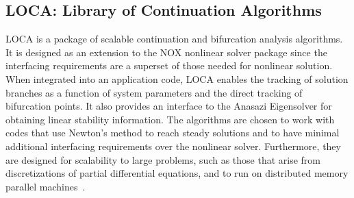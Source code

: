 \documentclass[12pt,relax]{TPA}
\begin{document}
%
%
% 
%

\subsection{LOCA: Library of Continuation Algorithms}

LOCA is a package of scalable continuation and bifurcation analysis algorithms.
It is designed as an extension to the NOX nonlinear solver package since
the interfacing requirements are a superset of those needed for nonlinear solution.
When integrated into an application code, 
LOCA enables the tracking of solution branches as a function of system 
parameters and the direct tracking of bifurcation points. It also provides
an interface to the Anasazi Eigensolver for obtaining linear stability 
information.  The algorithms are chosen to work with codes that use
Newton's method to reach steady solutions and to have minimal 
additional interfacing requirements over the nonlinear solver.
Furthermore, they are designed for scalability to
large problems, such as those that arise from 
discretizations of partial differential equations, and to run on distributed
memory parallel machines~\cite{LOCA-MPSalsa-paper}.  
\end{document}
